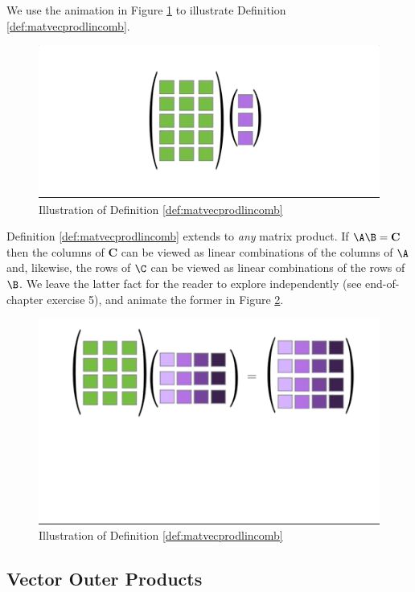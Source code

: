 \documentclass[
]{article}
\theoremstyle{definition}
\theoremstyle{definition}
\theoremstyle{definition}
\theoremstyle{definition}
\theoremstyle{remark}
\begin{document}
We use the animation in Figure \ref{fig:matvecprodlincombanim} to illustrate Definition \ref{def:matvecprodlincomb}.



\begin{figure}

{\centering \includegraphics[width=0.5\linewidth]{figs/matvecprodlincombanim} 

}

\caption{Illustration of Definition \ref{def:matvecprodlincomb}}\label{fig:matvecprodlincombanim}
\end{figure}

Definition \ref{def:matvecprodlincomb} extends to \emph{any} matrix product. If \(\A\B=\mathbf{C}\) then the columns of \(\mathbf{C}\) can be viewed as linear combinations of the columns of \(\A\) and, likewise, the rows of \(\C\) can be viewed as linear combinations of the rows of \(\B\). We leave the latter fact for the reader to explore independently (see end-of-chapter exercise 5), and animate the former in Figure \ref{fig:multlincombanim}.

\begin{figure}

{\centering \includegraphics[width=0.5\linewidth]{figs/multlincombanim} 

}

\caption{Illustration of Definition \ref{def:matvecprodlincomb}}\label{fig:multlincombanim}
\end{figure}

\hypertarget{vector-outer-products}{%
\subsection{Vector Outer Products}\label{vector-outer-products}}
\end{document}
